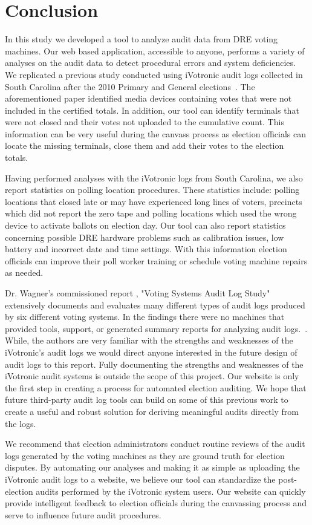 \section{Conclusion}
In this study we developed a tool to analyze audit data from DRE voting machines. Our web based application, accessible to anyone, performs a variety of analyses on the audit data to detect procedural errors and system deficiencies. We replicated a previous study conducted using iVotronic audit logs collected in South Carolina after the 2010 Primary and General elections~\cite{Buell2011}. The aforementioned paper identified media devices containing votes that were not included in the certified totals. In addition, our tool can identify terminals that were not closed and their votes not uploaded to the cumulative count. This information can be very useful during the canvass process as election officials can locate the missing terminals, close them and add their votes to the election totals. 

Having performed analyses with the iVotronic logs from South Carolina, we also report statistics on polling location procedures. These statistics include: polling locations that closed late or may have experienced long lines of voters, precincts which did not report the zero tape and polling locations which used the wrong device to activate ballots on election day. Our tool can also report statistics concerning possible DRE hardware problems such as calibration issues, low battery and incorrect date and time settings. With this information election officials can improve their poll worker training or schedule voting machine repairs as needed.

Dr. Wagner's commissioned report ,  "Voting Systems Audit Log Study" extensively documents and evaluates many different types of audit logs produced by six different voting systems.  In the findings there were no machines that provided tools, support, or generated summary reports for analyzing audit logs.~\cite{Wagner2010}. While, the authors are very familiar with the strengths and weaknesses of the iVotronic's audit logs we would direct anyone interested in the future design of audit logs to this report.  Fully documenting the strengths and weaknesses of the iVotronic audit systems is outside the scope of this project. Our website is only the first step in creating a process for automated election auditing.  We hope that future third-party audit log  tools can build on some of this previous work to create a useful and robust solution for deriving meaningful audits directly from the logs.

We recommend that election administrators conduct routine reviews of the audit logs generated by the voting machines as they are ground truth for election disputes. By automating our analyses and making it as simple as uploading the iVotronic audit logs to a website, we believe our tool can standardize the post-election audits performed by the iVotronic system users. Our website can quickly provide intelligent feedback to election officials during the canvassing process and serve to influence future audit procedures. 
